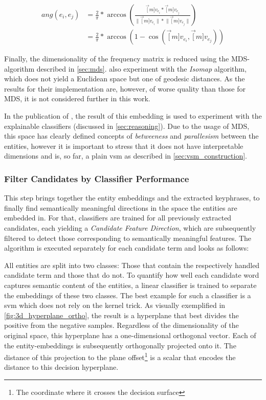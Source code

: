\vspace{-5ex}
\begin{align}
	ang(e_i, e_j) &= \frac{2}{\pi} * \arccos \left( \frac{\vec[m]{v_{e_i}} * \vec[m]{v_{e_j}}} { \lVert \vec[m]{v_{e_i}} \rVert * \lVert \vec[m]{v_{e_j}} \rVert }  \right)  \label{eq:norm_ang_dist} \\
	&= \frac{2}{\pi} * \arccos(1-\cos(\vec[m]{v_{e_i}},\vec[m]{v_{e_j}})) \nonumber
\end{align}

Finally, the dimensionality of the frequency matrix is reduced using the MDS-algorithm described in \autoref{sec:mds}. \cite{Derrac2015} also experiment with the \textit{Isomap} algorithm, which does not yield a Euclidean space but one of geodesic distances. As the results for their implementation are, however, of worse quality than those for MDS, it is not considered further in this work. 

In the publication of \textcite{Derrac2015}, the result of this embedding is used to experiment with the explainable classifiers (discussed in \autoref{sec:reasoning}). Due to the usage of MDS, this space has clearly defined concepts of \textit{betweeness} and \textit{parallesism} between the entities, however it is important to stress that it does not have interpretable dimensions and is, so far, a plain \gls{vsm} as described in \autoref{sec:vsm_construction}. 


\subsubsection{Filter Candidates by Classifier Performance}
\label{sec:svm_filter_cands}

This step brings together the entity embeddings and the extracted keyphrases, to finally find semantically meaningful directions in the space the entities are embedded in. For that, classifiers are trained for all previously extracted candidates, each yielding a \textit{Candidate Feature Direction}, which are subsequently filtered to detect those corresponding to semantically meaningful features. The algorithm is executed separately for each candidate term and looks as follows:

All entities are split into two classes: Those that contain the respectively handled candidate term and those that do not. To quantify how well each candidate word captures semantic content of the entities, a linear classifier is trained to separate the embeddings of these two classes. The best example for such a classifier is a \gls{svm} which does not rely on the kernel trick. As visually exemplified in \autoref{fig:3d_hyperplane_ortho}, the result is a hyperplane that best divides the positive from the negative samples. Regardless of the dimensionality of the original space, this hyperplane has a one-dimensional orthogonal vector. Each of the entity-embeddings is subsequently orthogonally projected onto it. The distance of this projection to the plane offset\footnote{The coordinate where it crosses the decision surface} is a scalar that encodes the distance to this decision hyperplane. 

